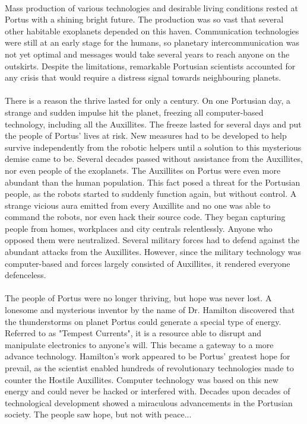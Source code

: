 \documentclass[../Main.tex]{subfiles}
\begin{document}
\paragraph{}
Mass production of various technologies and desirable living conditions rested at Portus with a shining bright future. The production was so vast that several other habitable exoplanets depended on this haven. Communication technologies were still at an early stage for the humans, so planetary intercommunication was not yet optimal and messages would take several years to reach anyone on the outskirts. Despite the limitations, remarkable Portusian scientists accounted for any crisis that would require a distress signal towards neighbouring planets.

\paragraph{}
There is a reason the thrive lasted for only a century. On one Portusian day, a strange and sudden impulse hit the planet, freezing all computer-based technology, including all the Auxillites. The freeze lasted for several days and put the people of Portus' lives at risk. New measures had to be developed to help survive independently from the robotic helpers until a solution to this mysterious demise came to be. Several decades passed without assistance from the Auxillites, nor even people of the exoplanets. The Auxillites on Portus were even more abundant than the human population. This fact posed a threat for the Portusian people, as the robots started to suddenly function again, but without control. A strange vicious aura emitted from every Auxillite and no one was able to command the robots, nor even hack their source code. They began capturing people from homes, workplaces and city centrals relentlessly. Anyone who opposed them were neutralized. Several military forces had to defend against the abundant attacks from the Auxillites. However, since the military technology was computer-based and forces largely consisted of Auxillites, it rendered everyone defenceless. 

\paragraph{}
The people of Portus were no longer thriving, but hope was never lost. A lonesome and mysterious inventor by the name of Dr. Hamilton discovered that the thunderstorms on planet Portus could generate a special type of energy. Referred to as "Tempest Currents", it is a resource able to disrupt and manipulate electronics to anyone's will.  This became a gateway to a more advance technology. Hamilton's work appeared to be Portus' greatest hope for prevail, as the scientist enabled hundreds of revolutionary technologies made to counter the Hostile Auxillites. Computer technology was based on this new energy and could never be hacked or interfered with. Decades upon decades of  technological development showed a miraculous advancements in the Portusian society. The people saw hope, but not with peace...
\end{document}
